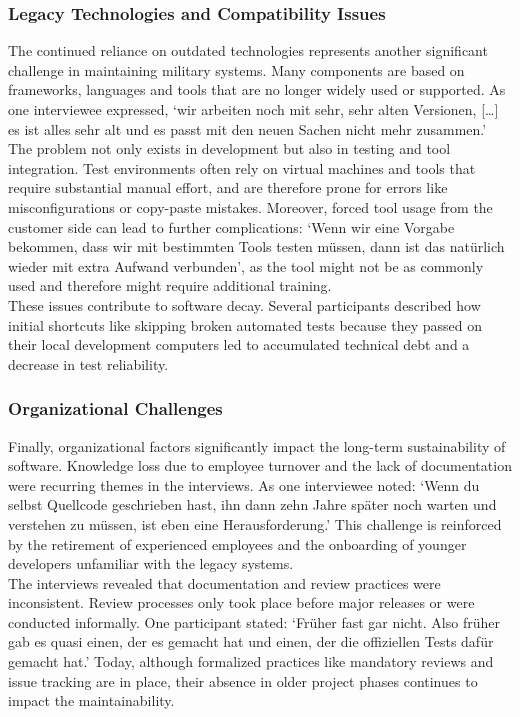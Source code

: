 \subsubsection{Legacy Technologies and Compatibility Issues}
The continued reliance on outdated technologies represents another significant challenge in maintaining military systems. Many components are based on frameworks, languages and tools that are no longer widely used or supported.
As one interviewee expressed, `wir arbeiten noch mit sehr, sehr alten Versionen, [\ldots] es ist alles sehr alt und es passt mit den neuen Sachen nicht mehr zusammen.'\\

The problem not only exists in development but also in testing and tool integration. Test environments often rely on virtual machines and tools that require substantial manual effort, and are therefore prone for errors like misconfigurations or copy-paste mistakes.
Moreover, forced tool usage from the customer side can lead to further complications: `Wenn wir eine Vorgabe bekommen, dass wir mit bestimmten Tools testen müssen, dann ist das natürlich wieder mit extra Aufwand verbunden', as the tool might not be as commonly used and therefore might require additional training.\\

These issues contribute to software decay. Several participants described how initial shortcuts like skipping broken automated tests because they passed on their local development computers led to accumulated technical debt and a decrease in test reliability.\\

\subsubsection{Organizational Challenges}
Finally, organizational factors significantly impact the long-term sustainability of software. Knowledge loss due to employee turnover and the lack of documentation were recurring themes in the interviews.
As one interviewee noted: `Wenn du selbst Quellcode geschrieben hast, ihn dann zehn Jahre später noch warten und verstehen zu müssen, ist eben eine Herausforderung.' This challenge is reinforced by the retirement of experienced employees and the onboarding of younger developers
unfamiliar with the legacy systems.\\

The interviews revealed that documentation and review practices were inconsistent. Review processes only took place before major releases or were conducted informally. One participant stated:
`Früher fast gar nicht. Also früher gab es quasi einen, der es gemacht hat und einen, der die offiziellen Tests dafür gemacht hat.' Today, although formalized practices like mandatory reviews and issue tracking are in place, their absence in older project 
phases continues to impact the maintainability. 

